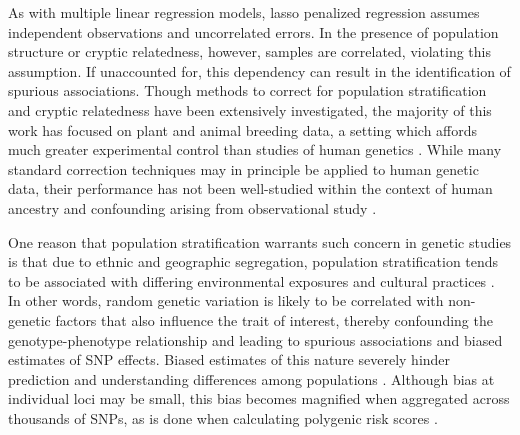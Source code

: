 As with multiple linear regression models, lasso penalized regression assumes independent observations and uncorrelated errors. In the presence of population structure or cryptic relatedness, however, samples are correlated, violating this assumption. If unaccounted for, this dependency can result in the identification of spurious associations. Though methods to correct for population stratification and cryptic relatedness have been extensively investigated, the majority of this work has focused on plant and animal breeding data, a setting which affords much greater experimental control than studies of human genetics \citep{Amin2007, hoffman2013correcting, price2006principal, Rakitsch2012, bhatnagar2020simultaneous, Sillanpaeae2011}. While many standard correction techniques may in principle be applied to human genetic data, their performance has not been well-studied within the context of human ancestry and confounding arising from observational study \citep{lawson2019population, barton2019population}.  

One reason that population stratification warrants such concern in genetic studies is that due to ethnic and geographic segregation, population stratification tends to be associated with differing environmental exposures and cultural practices \citep{thornton2015statistical, browning2011population}.  In other words, random genetic variation is likely to be correlated with non-genetic factors that also influence the trait of interest, thereby confounding the genotype-phenotype relationship and leading to spurious associations and biased estimates of SNP effects. Biased estimates of this nature severely hinder prediction and understanding differences among populations \citep{barton2019population}. Although bias at individual loci may be small, this bias becomes magnified when aggregated across thousands of SNPs, as is done when calculating polygenic risk scores \citep{barton2019population, peterson2019genome}.

